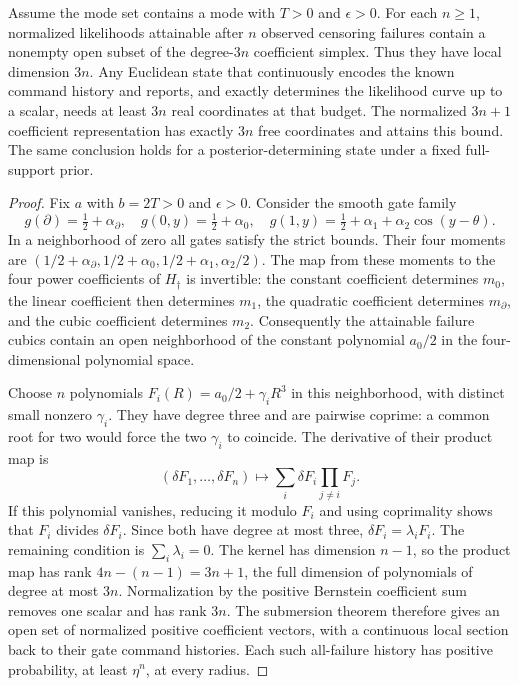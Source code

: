 \begin{theorem}\label{thm:dimension}
Assume the mode set contains a mode with $T>0$ and $\epsilon>0$. For each
$n\ge1$, normalized likelihoods attainable after $n$ observed censoring
failures contain a nonempty open subset of the degree-$3n$ coefficient
simplex. Thus they have local dimension $3n$. Any Euclidean state that
continuously encodes the known command history and reports, and exactly
determines the likelihood curve up to a scalar, needs at least $3n$ real
coordinates at that budget. The normalized $3n+1$ coefficient representation
has exactly $3n$ free coordinates and attains this bound. The same conclusion
holds for a posterior-determining state under a fixed full-support prior.
\end{theorem}
\begin{proof}
Fix $a$ with $b=2T>0$ and $\epsilon>0$. Consider the smooth gate family
\[
 g(\partial)=\tfrac12+\alpha_\partial,\quad
 g(0,y)=\tfrac12+\alpha_0,\quad
 g(1,y)=\tfrac12+\alpha_1+\alpha_2\cos(y-\theta).
\]
In a neighborhood of zero all gates satisfy the strict bounds. Their four
moments are $(1/2+\alpha_\partial,1/2+\alpha_0,1/2+\alpha_1,\alpha_2/2)$.
The map from these moments to the four power coefficients of
$H_\dagger$ is invertible: the constant coefficient determines $m_0$,
the linear coefficient then determines $m_1$, the quadratic coefficient
determines $m_\partial$, and the cubic coefficient determines $m_2$.
Consequently the attainable failure cubics contain an open neighborhood of
the constant polynomial $a_0/2$ in the four-dimensional polynomial space.

Choose $n$ polynomials $F_i(R)=a_0/2+\gamma_iR^3$ in this neighborhood,
with distinct small nonzero $\gamma_i$. They have degree three and are
pairwise coprime: a common root for two would force the two $\gamma_i$ to
coincide. The derivative of their product map is
\[
 (\delta F_1,\ldots,\delta F_n)\longmapsto
                 \sum_i\delta F_i\prod_{j\ne i}F_j.
\]
If this polynomial vanishes, reducing it modulo $F_i$ and using coprimality
shows that $F_i$ divides $\delta F_i$. Since both have degree at most three,
$\delta F_i=\lambda_iF_i$. The remaining condition is
$\sum_i\lambda_i=0$. The kernel has dimension $n-1$, so the product map
has rank $4n-(n-1)=3n+1$, the full dimension of polynomials of degree at most
$3n$. Normalization by the positive Bernstein coefficient sum removes one
scalar and has rank $3n$. The submersion theorem therefore gives an open
set of normalized positive coefficient vectors, with a continuous local
section back to their gate command histories. Each such all-failure history
has positive probability, at least $\eta^n$, at every radius.


\end{proof}
